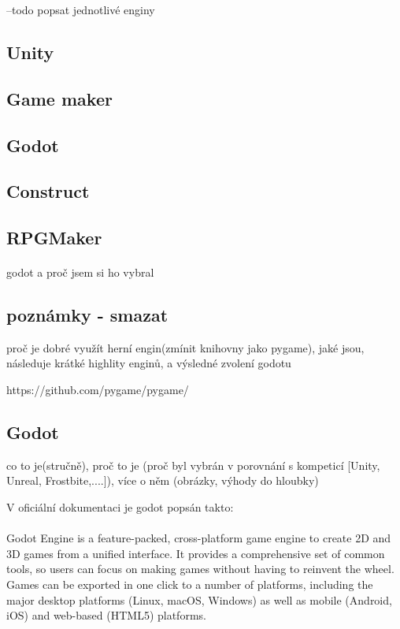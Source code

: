 --todo popsat jednotlivé enginy
\subsection{Unity}


\subsection{Game maker}

\subsection{Godot}

\subsection{Construct}

\subsection{RPGMaker}


\paragraph{} godot a proč jsem si ho vybral

	\subsection{poznámky - smazat}
	proč je dobré využít herní engin(zmínit knihovny jako pygame), jaké jsou, následuje krátké highlity enginů, a výsledné zvolení godotu

	https://github.com/pygame/pygame/

	\subsection{Godot}
	co to je(stručně), proč to je (proč byl vybrán  v porovnání s kompeticí [Unity, Unreal, Frostbite,....]), více o  něm (obrázky, výhody do hloubky)

	V oficiální dokumentaci je godot popsán takto:

		\paragraph{}
		Godot Engine is a feature-packed, cross-platform game engine to create 2D and 3D games from a unified interface. It provides a comprehensive set of common tools, so users can focus on making games without having to reinvent the wheel. Games can be exported in one click to a number of platforms, including the major desktop platforms (Linux, macOS, Windows) as well as mobile (Android, iOS) and web-based (HTML5) platforms.

